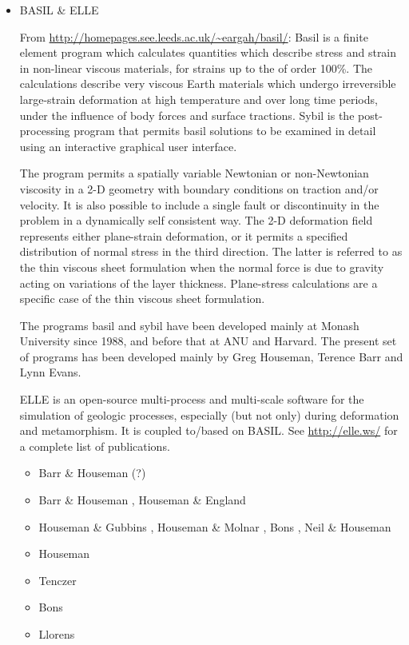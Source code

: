 \begin{itemize}
\item {\codefont BASIL \& ELLE} 

From \url{http://homepages.see.leeds.ac.uk/~eargah/basil/}:
Basil is a finite element program which calculates quantities which describe  stress  and strain in non-linear viscous materials, for strains up to the of order 100\%.   
The calculations  describe  very  viscous  Earth materials which undergo irreversible large-strain 
deformation at  high  temperature  and over long time periods, under the influence of body 
forces and surface tractions.  Sybil  is the post-processing program that permits basil 
solutions to be examined in detail using an interactive graphical user interface.

The program permits a spatially variable Newtonian  or  non-Newtonian  viscosity  in a 2-D 
geometry with boundary conditions on traction and/or velocity.  It is also  possible  
to include  a single fault or discontinuity in the problem in a dynamically self consistent way.  
The 2-D deformation  field represents  either plane-strain deformation, or it permits 
a specified distribution of normal stress in the third  direction.   The  latter is referred 
to as the thin viscous sheet formulation when the normal force is due to  gravity  acting on 
variations of the layer thickness.  Plane-stress calculations are a specific case of 
the thin viscous sheet formulation.

The programs basil and sybil have been developed  mainly  at Monash  University  since  1988,  
and before that at ANU and Harvard.  The present set of  programs  has  been  developed mainly  by  
Greg  Houseman, Terence  Barr  and  Lynn Evans.

ELLE is an open-source multi-process and multi-scale software for the simulation of geologic processes, especially (but not only) during deformation and metamorphism. It is coupled to/based on BASIL. See \url{http://elle.ws/} for a complete list of publications.

\begin{scriptsize}
\begin{itemize}
\item[\nineteenninetytwo] Barr \& Houseman \cite{baho92}(?)
\item[\nineteenninetysix] Barr \& Houseman \cite{baho96}, Houseman \& England \cite{hoen96}
\item[\nineteenninetyseven] Houseman \& Gubbins \cite{hogu97}, Houseman \& Molnar \cite{homo97},
                            Bons \etal \cite{bobt97}, Neil \& Houseman \cite{neho97}
\item[\twothousand] Houseman \etal \cite{honk00}
\item[\twothousandone] Tenczer \etal \cite{tesb01}
\item[\twothousandeight] Bons \etal \cite{bokj08}
\item[\twothousandnineteen] Llorens \cite{llor19}
\end{itemize}
\end{scriptsize}


\end{itemize}
